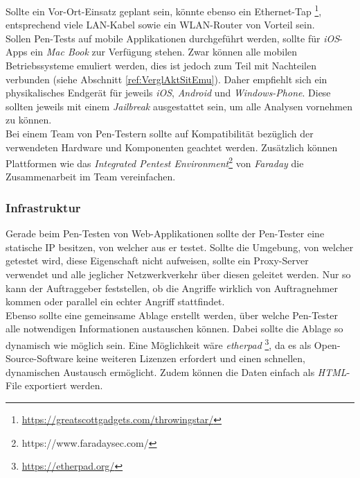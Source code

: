 		Sollte ein Vor-Ort-Einsatz geplant sein, könnte ebenso ein Ethernet-Tap \footnote{\url{https://greatscottgadgets.com/throwingstar/}}, entsprechend viele LAN-Kabel sowie ein WLAN-Router von Vorteil sein.\\
		
		Sollen Pen-Tests auf mobile Applikationen durchgeführt werden, sollte für \textit{iOS}-Apps ein \textit{Mac Book} zur Verfügung stehen. Zwar können alle mobilen Betriebssysteme emuliert werden, dies ist jedoch zum Teil mit Nachteilen verbunden (siehe Abschnitt \ref{ref:VerglAktSitEmu}). Daher empfiehlt sich ein physikalisches Endgerät für jeweils \textit{iOS}, \textit{Android} und \textit{Windows-Phone}. Diese sollten jeweils mit einem \textit{Jailbreak} ausgestattet sein, um alle Analysen vornehmen zu können.\\
		
		Bei einem Team von Pen-Testern sollte auf Kompatibilität bezüglich der verwendeten Hardware und Komponenten geachtet werden. Zusätzlich können Plattformen wie das \textit{Integrated Pentest Environment}\footnote{https://www.faradaysec.com/} von \textit{Faraday} die Zusammenarbeit im Team vereinfachen.

		\subsubsection{Infrastruktur}\label{ref:vorbInfrastruktur}
		Gerade beim Pen-Testen von Web-Applikationen sollte der Pen-Tester eine statische IP besitzen, von welcher aus er testet. Sollte die Umgebung, von welcher getestet wird, diese Eigenschaft nicht aufweisen, sollte ein Proxy-Server verwendet und alle jeglicher Netzwerkverkehr über diesen geleitet werden. Nur so kann der Auftraggeber feststellen, ob die Angriffe wirklich von Auftragnehmer kommen oder parallel ein echter Angriff stattfindet.\\
		
		Ebenso sollte eine gemeinsame Ablage erstellt werden, über welche Pen-Tester alle notwendigen Informationen austauschen können. Dabei sollte die Ablage so dynamisch wie möglich sein. Eine Möglichkeit wäre \textit{etherpad} \footnote{\url{https://etherpad.org/}}, da es als Open-Source-Software keine weiteren Lizenzen erfordert und einen schnellen, dynamischen Austausch ermöglicht. Zudem können die Daten einfach als \textit{HTML}-File exportiert werden.
		
